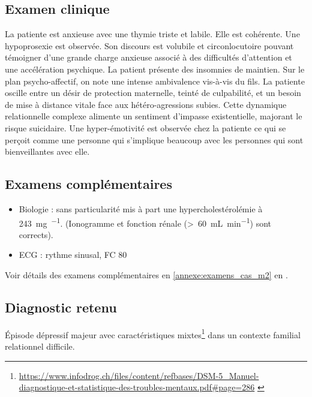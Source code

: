\subsection{Examen clinique}
La patiente est anxieuse avec une thymie triste et labile.
Elle est cohérente. Une hypoprosexie est observée. 
Son discours est volubile et circonlocutoire pouvant témoigner d’une grande charge anxieuse associé à des difficultés d’attention et une accélération psychique. 
La patient présente des insomnies de maintien. 
Sur le plan psycho-affectif, on note une intense ambivalence vis-à-vis du fils. 
La patiente oscille entre un désir de protection maternelle, teinté de culpabilité, et un besoin de mise à distance vitale face aux hétéro-agressions subies. Cette dynamique relationnelle complexe alimente un sentiment d'impasse existentielle, majorant le risque suicidaire. 
Une hyper-émotivité est observée chez la patiente ce qui se perçoit comme une personne qui s’implique beaucoup avec les personnes qui sont bienveillantes avec elle. 

\subsection{Examens complémentaires}
\begin{itemize}[compact, label=\textbullet]
    \item Biologie : sans particularité mis à part une hypercholestérolémie à \qty{243}{\mg\per\dL}. (Ionogramme et fonction rénale (>~\qty{60}{\mL\per\minute}) sont corrects).
    \item ECG : rythme sinusal, FC \qty{80}{\bpm}
\end{itemize}
Voir détails des examens complémentaires en \cref{annexe:examens_cas_m2} en .

\subsection{Diagnostic retenu}
 
Épisode dépressif majeur avec caractéristiques mixtes\footnote{\url{https://www.infodrog.ch/files/content/refbases/DSM-5_Manuel-diagnostique-et-statistique-des-troubles-mentaux.pdf\#page=286} \parencite{dsm5_online}}  dans un contexte familial relationnel difficile.

